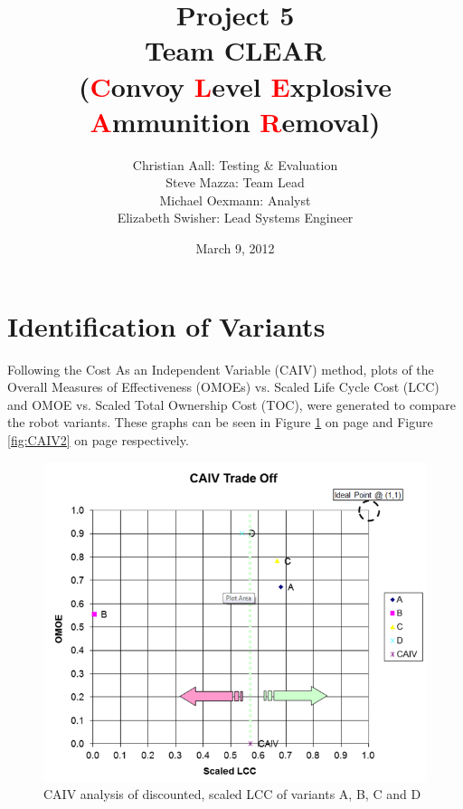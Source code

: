 \documentclass[letterpaper,10pt]{article}
\title{Project 5 \\ \Large Team CLEAR \\ \normalsize (\textcolor{red}{C}onvoy \textcolor{red}{L}evel \textcolor{red}{E}xplosive \textcolor{red}{A}mmunition \textcolor{red}{R}emoval)}
\author{Christian Aall: Testing \& Evaluation \\ 
	Steve Mazza: Team Lead \\ 
	Michael Oexmann: Analyst \\ 
	Elizabeth Swisher: Lead Systems Engineer}
\date{March 9, 2012}
\begin{document}
\maketitle
\tableofcontents
\listoftables
\listoffigures
\pagebreak

\section{Identification of Variants}
Following the Cost As an Independent Variable (CAIV) method, plots of the Overall Measures of Effectiveness (OMOEs) vs. Scaled Life Cycle Cost (LCC) and OMOE vs. Scaled Total Ownership Cost (TOC), were generated to compare the robot variants. These graphs can be seen in Figure \ref{fig:CAIV1} on page \pageref{fig:CAIV1} and Figure \ref{fig:CAIV2} on page \pageref{fig:CAIV2} respectively. 

\begin{figure}[h!tbp]
	\begin{center}
		\includegraphics[scale=0.65]{images/CAIV1.png}
	\end{center}
	\caption{CAIV analysis of discounted, scaled LCC of variants A, B, C and D}
	\label{fig:CAIV1}
\end{figure}
\end{document}
